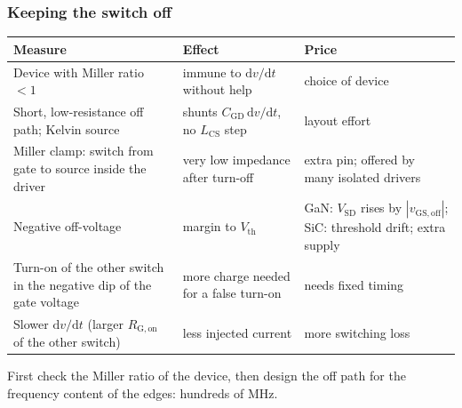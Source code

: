 \begin{frame}
	\frametitle{Keeping the switch off}
	\begin{table}
		\centering
		\footnotesize
		\begin{tabular}{|>{\raggedright\arraybackslash}p{4.4cm}|>{\raggedright\arraybackslash}p{4.4cm}|>{\raggedright\arraybackslash}p{4.6cm}|}
			\hline
			\textbf{Measure}                                                   & \textbf{Effect}                                            & \textbf{Price}                                                                         \\
			\hline
			Device with Miller ratio $<1$                                      & immune to $\mathrm{d}v/\mathrm{d}t$ without help           & choice of device                                                                       \\
			Short, low-resistance off path; Kelvin source                      & shunts $C_\mathrm{GD}\,\mathrm{d}v/\mathrm{d}t$, no $L_\mathrm{CS}$ step & layout effort                                                    \\
			Miller clamp: switch from gate to source inside the driver         & very low impedance after turn-off                          & extra pin; offered by many isolated drivers                                            \\
			Negative off-voltage                                               & margin to $V_\mathrm{th}$                                  & GaN: $V_\mathrm{SD}$ rises by $|v_\mathrm{GS,off}|$; SiC: threshold drift; extra supply \\
			Turn-on of the other switch in the negative dip of the gate voltage & more charge needed for a false turn-on                    & needs fixed timing                                                                     \\
			Slower $\mathrm{d}v/\mathrm{d}t$ (larger $R_\mathrm{G,on}$ of the other switch) & less injected current                         & more switching loss                                                                    \\
			\hline
		\end{tabular}
	\end{table}
	First check the Miller ratio of the device, then design the off path for the frequency content of the edges: hundreds of MHz.
\end{frame}

